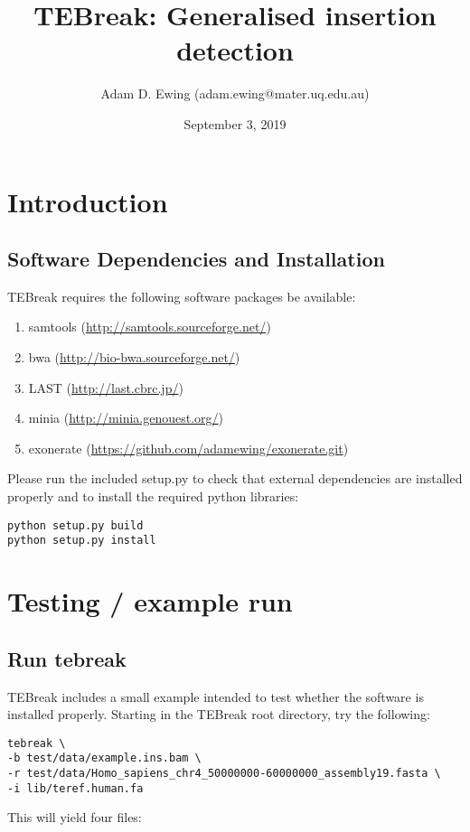\documentclass[letterpaper,11pt]{article}
\title{TEBreak: Generalised insertion detection}
\author{Adam D. Ewing (adam.ewing@mater.uq.edu.au)}
\begin{document}
 \date{September 3, 2019}
 \maketitle

\section{Introduction}
\subsection{Software Dependencies and Installation}
TEBreak requires the following software packages be available:

\begin{enumerate}
  \item samtools (\url{http://samtools.sourceforge.net/})
  \item bwa (\url{http://bio-bwa.sourceforge.net/})
  \item LAST (\url{http://last.cbrc.jp/})
  \item minia (\url{http://minia.genouest.org/})
 \item exonerate (\url{https://github.com/adamewing/exonerate.git})
\end{enumerate}

Please run the included setup.py to check that external dependencies are installed properly and to install the required python libraries:

\begin{verbatim}
python setup.py build
python setup.py install
\end{verbatim}

\section{Testing / example run}
\subsection{Run tebreak}
TEBreak includes a small example intended to test whether the software is installed properly.
Starting in the TEBreak root directory, try the following:

\begin{verbatim}
tebreak \
-b test/data/example.ins.bam \
-r test/data/Homo_sapiens_chr4_50000000-60000000_assembly19.fasta \
-i lib/teref.human.fa
\end{verbatim}

This will yield four files: 
\end{document}
